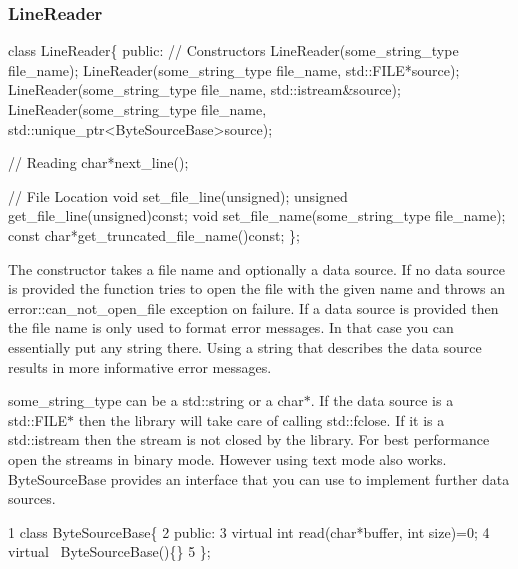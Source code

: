 \subsubsection*{{\ttfamily Line\+Reader}}


\begin{DoxyCode}
\textcolor{keyword}{class }LineReader\{
\textcolor{keyword}{public}:
  \textcolor{comment}{// Constructors}
  LineReader(some\_string\_type file\_name);
  LineReader(some\_string\_type file\_name, std::FILE*source);
  LineReader(some\_string\_type file\_name, std::istream&source);
  LineReader(some\_string\_type file\_name, std::unique\_ptr<ByteSourceBase>source);

  \textcolor{comment}{// Reading}
  \textcolor{keywordtype}{char}*next\_line();

  \textcolor{comment}{// File Location}
  \textcolor{keywordtype}{void} set\_file\_line(\textcolor{keywordtype}{unsigned});
  \textcolor{keywordtype}{unsigned} get\_file\_line(\textcolor{keywordtype}{unsigned})\textcolor{keyword}{const};
  \textcolor{keywordtype}{void} set\_file\_name(some\_string\_type file\_name);
  \textcolor{keyword}{const} \textcolor{keywordtype}{char}*get\_truncated\_file\_name()\textcolor{keyword}{const};
\};
\end{DoxyCode}


The constructor takes a file name and optionally a data source. If no data source is provided the function tries to open the file with the given name and throws an {\ttfamily error\+::can\+\_\+not\+\_\+open\+\_\+file exception} on failure. If a data source is provided then the file name is only used to format error messages. In that case you can essentially put any string there. Using a string that describes the data source results in more informative error messages.

{\ttfamily some\+\_\+string\+\_\+type} can be a {\ttfamily std\+::string} or a {\ttfamily char$\ast$}. If the data source is a {\ttfamily std\+::\+F\+I\+LE$\ast$} then the library will take care of calling {\ttfamily std\+::fclose}. If it is a {\ttfamily std\+::istream} then the stream is not closed by the library. For best performance open the streams in binary mode. However using text mode also works. {\ttfamily Byte\+Source\+Base} provides an interface that you can use to implement further data sources.


\begin{DoxyCode}
1 class ByteSourceBase\{
2 public:
3   virtual int read(char*buffer, int size)=0;
4   virtual ~ByteSourceBase()\{\}
5 \};
\end{DoxyCode}


